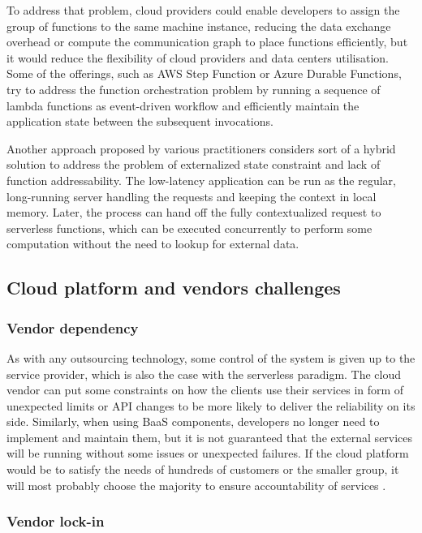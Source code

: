 To address that problem, cloud providers could enable developers to assign the group of functions to the same machine instance, reducing the data exchange overhead or compute the communication graph to place functions efficiently, but it would reduce the flexibility of cloud providers and data centers utilisation. Some of the offerings, such as AWS Step Function or Azure Durable Functions, try to address the function orchestration problem by running a sequence of lambda functions as event-driven workflow and efficiently maintain the application state between the subsequent invocations.

Another approach proposed by various practitioners considers sort of a hybrid solution to address the problem of externalized state constraint and lack of function addressability. The low-latency application can be run as the regular, long-running server handling the requests and keeping the context in local memory. Later, the process can hand off the fully contextualized request to serverless functions, which can be executed concurrently to perform some computation without the need to lookup for external data.

\subsection{Cloud platform and vendors challenges} \label{chapter:serverless-cloud-platform-and-vendor-challenges}

\subsubsection{Vendor dependency} \label{chapter:serverless-vendor-dependence}

As with any outsourcing technology, some control of the system is given up to the service provider, which is also the case with the serverless paradigm. The cloud vendor can put some constraints on how the clients use their services in form of unexpected limits or API changes to be more likely to deliver the reliability on its side. Similarly, when using BaaS components, developers no longer need to implement and maintain them, but it is not guaranteed that the external services will be running without some issues or unexpected failures. If the cloud platform would be to satisfy the needs of hundreds of customers or the smaller group, it will most probably choose the majority to ensure accountability of services \cite{MartinFowlerServerless}.

\subsubsection{Vendor lock-in}

